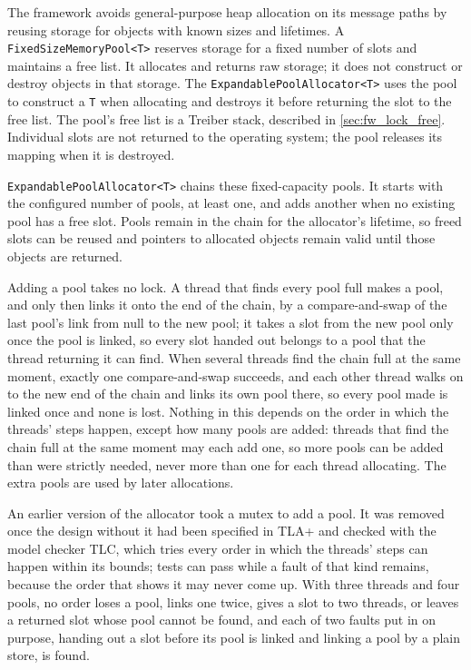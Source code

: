 The framework avoids general-purpose heap allocation on its message paths by
reusing storage for objects with known sizes and lifetimes. A
\texttt{FixedSizeMemoryPool<T>} reserves storage for a fixed number of slots
and maintains a free list. It allocates and returns raw storage; it does not
construct or destroy objects in that storage. The
\texttt{ExpandablePoolAllocator<T>} uses the pool to construct a \texttt{T}
when allocating and destroys it before returning the slot to the free list.
The pool's free list is a Treiber stack, described in
\cref{sec:fw_lock_free}. Individual slots are not returned to the operating
system; the pool releases its mapping when it is destroyed.

\texttt{ExpandablePoolAllocator<T>} chains these fixed-capacity pools. It
starts with the configured number of pools, at least one, and adds another when
no existing pool has a free slot. Pools remain in the chain for the allocator's
lifetime, so freed slots can be reused and pointers to allocated objects remain
valid until those objects are returned.

Adding a pool takes no lock. A thread that finds every pool full makes a pool,
and only then links it onto the end of the chain, by a compare-and-swap of the
last pool's link from null to the new pool; it takes a slot from the new pool
only once the pool is linked, so every slot handed out belongs to a pool that
the thread returning it can find. When several threads find the chain full at
the same moment, exactly one compare-and-swap succeeds, and each other thread
walks on to the new end of the chain and links its own pool there, so every
pool made is linked once and none is lost. Nothing in this depends on the order
in which the threads' steps happen, except how many pools are added: threads
that find the chain full at the same moment may each add one, so more pools can
be added than were strictly needed, never more than one for each thread
allocating. The extra pools are used by later allocations.

An earlier version of the allocator took a mutex to add a pool. It was removed
once the design without it had been specified in TLA+ and checked with the
model checker TLC, which tries every order in which the threads' steps can
happen within its bounds; tests can pass while a fault of that kind remains,
because the order that shows it may never come up. With three threads and four
pools, no order loses a pool, links one twice, gives a slot to two threads, or
leaves a returned slot whose pool cannot be found, and each of two faults put
in on purpose, handing out a slot before its pool is linked and linking a pool
by a plain store, is found.

